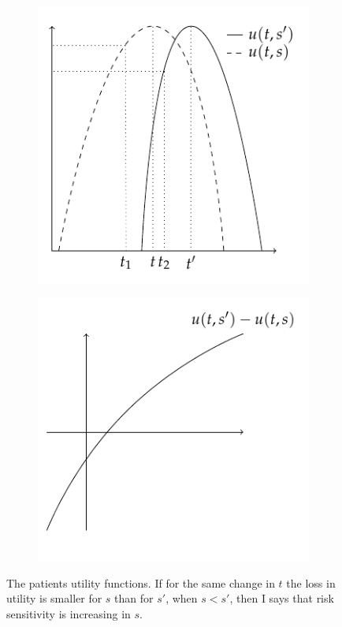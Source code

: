 \documentclass[10pt,a4paper]{article} 					%
\begin{document}
\begin{figure}
     \centering
    \begin{subfigure}[b]{0.49\textwidth}
		\includegraphics[width=\textwidth]{../fig/patient-utility.pdf}
	\end{subfigure}
    \begin{subfigure}[b]{0.49\textwidth}
		\includegraphics[width=\textwidth]{../fig/single-crossing-property.pdf}
	\end{subfigure}
\caption{\label{fig:The-patients-utility}The patients utility functions. If for the same change in $t$ the loss in utility is smaller for $s$ than for $s'$, when $s<s'$, then I says that risk sensitivity is increasing in $s$.}
\end{figure}
\end{document}

